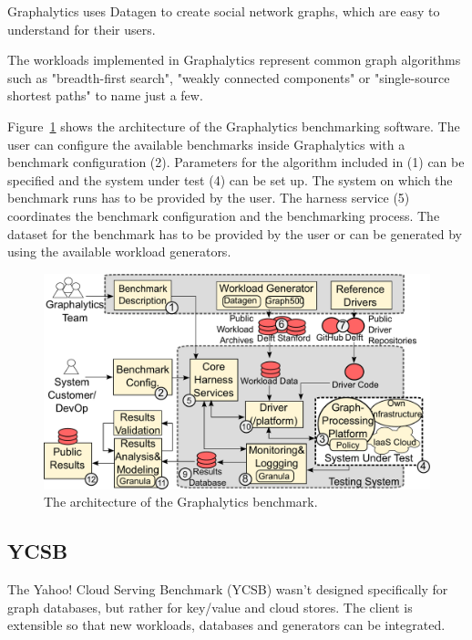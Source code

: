 Graphalytics uses Datagen to create social network graphs,
which are easy to understand for their users.~\cite[3]{Capota2015}

The workloads implemented in Graphalytics represent common graph algorithms such as "breadth-first search",
"weakly connected components" or "single-source shortest paths" to name just a few.~\cite[7]{Iosup}

Figure~\ref{fig:graphalyticsArchitecture} shows the architecture of the Graphalytics benchmarking software.
The user can configure the available benchmarks inside Graphalytics with a benchmark configuration (2).
Parameters for the algorithm included in (1) can be specified and the system under test (4) can be set up.
The system on which the benchmark runs has to be provided by the user.
The harness service (5) coordinates the benchmark configuration and the benchmarking process.
The dataset for the benchmark has to be provided by the user or can be generated by using the available workload generators.~\cite[11]{Iosup}

\begin{figure}[h!]
  \centering
  \includegraphics[width=.75\textwidth]{images/benchmarks/GraphalyticsArchitecture}
  \caption{The architecture of the Graphalytics benchmark.~\cite[11]{Iosup}}
  \label{fig:graphalyticsArchitecture}
\end{figure}

\pagebreak

\subsection{YCSB}
\label{ch:background:se:ycsb}
The Yahoo! Cloud Serving Benchmark (YCSB) wasn't designed specifically for graph databases,
but rather for key/value and cloud stores.
The client is extensible so that new workloads,
databases and generators can be integrated.~\cite{Yahoo!2010}

